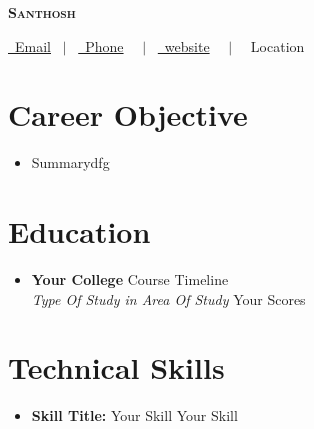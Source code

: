 \documentclass[letterpaper,5pt]{article}
\begin{document}
    
    \begin{center}
      \textbf{\Huge \scshape Santhosh} \\ \vspace{5pt}
      
      \href{mailto:Email}{\raisebox{-0.05\height}\faEnvelope \ Email} 
      \ $|$ \ \href{tel:Phone}{\raisebox{-0.05\height}\faMobile \ Phone}  \
      \ $|$ \ \href{website}{\raisebox{-0.05\height}\faGlobe \ website}  \
      \ $|$ \ {\raisebox{-0.05\height}\faMapMarker \ Location} \ \
    \end{center}
    
      \section{Career Objective}
        \begin{itemize}[leftmargin=0.15in, label={}]
          \item{Summarydfg}
        \end{itemize}
    
    \section{Education}
      
        \begin{itemize}[leftmargin=0.15in, label={}]
        \item[]
            \textbf{Your College} \hfill Course Timeline \\
            \textit{Type Of Study in Area Of Study} \hfill Your Scores
        \end{itemize}
      
      

    
    \section{Technical Skills}
    
        \begin{itemize}[leftmargin=0.15in,label={}]
        \item{
          \textbf{Skill Title: }{\textbullet{} Your Skill \textbullet{} Your Skill \newline}
        }
        \end{itemize}
        \vspace*{-6mm}  
        
\end{document}
